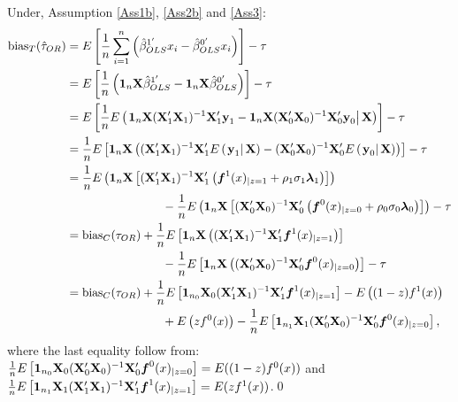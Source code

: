 \documentclass[11pt]{article}
\newcommand{\X}{{\bf X}}
\newcommand{\y}{{\bf y}}
\newcommand{\bias}{\mbox{bias}}
\begin{document}
\vspace{5mm}
\noindent Under, Assumption \ref{Ass1b}, \ref{Ass2b} and \ref{Ass3}: 
\begin{align*}
\bias_T(\hat \tau_{OR})&=E\left[\frac{1}{n}\sum \limits_{i =1}^n\left( \hat\beta^{1'}_{OLS}x_i-\hat\beta^{0'}_{OLS}x_i\right)\right] - \tau \\
&=E\left[\frac{1}{n}\left({\bf1}_n \X \hat\beta^{1'}_{OLS}- {\bf1}_n \X \hat\beta^{0'}_{OLS}\right)\right] - \tau\\
&= E\left[\frac{1}{n}E\left( \left.{\bf1}_n \X (\X_1'\X_1)^{-1}\X_1' \boldsymbol \y_1 - {\bf1}_n \X (\X_0'\X_0)^{-1}\X_0' \boldsymbol \y_0\right| \X\right)\right] -\tau\\
&=\frac{1}{n}E\left[ {\bf1}_n \X \left((\X_1'\X_1)^{-1}\X_1'E\left( \left.  \boldsymbol \y_1 \right| \X\right) -(\X_0'\X_0)^{-1}\X_0'E\left( \left.  \boldsymbol \y_0\right| \X\right) \right)\right]- \tau\\
&=\frac{1}{n}E\left( {\bf1}_n \X \left[(\X_1'\X_1)^{-1}\X_1' \left(  \boldsymbol f^1(x)_{|z=1} +\rho_1 \sigma_1 {\boldsymbol \lambda_1}\right)\right]\right)\\
&\qquad\qquad\qquad\qquad-\frac{1}{n}E\left( {\bf1}_n \X \left[(\X_0'\X_0)^{-1}\X_0'\left(  \boldsymbol f^0(x)_{|z=0} +\rho_0 \sigma_0 {\boldsymbol \lambda_0}\right)\right]\right)- \tau\\
&=\mbox{bias}_C(\tau_{OR})+\frac{1}{n}E\left[ {\bf1}_n \X \left((\X_1'\X_1)^{-1}\X_1'  \boldsymbol f^1(x)_{|z=1}  \right) \right]\\
&\qquad \qquad \qquad \qquad -\frac{1}{n}E\left[ {\bf1}_n \X \left((\X_0'\X_0)^{-1}\X_0'  \boldsymbol f^0(x)_{|z=0} \right) \right]- \tau\\
&=\mbox{bias}_C(\tau_{OR})+\frac{1}{n}E\left[ {\bf1}_{n_0} \X_0 (\X_1'\X_1)^{-1}\X_1'  \boldsymbol f^1(x)_{|z=1} \right]- E\left((1-z) f^1(x)\right)\\
&\qquad \qquad \qquad \qquad + E\left(z f^0(x) \right) - \frac{1}{n}E\left[ {\bf1}_{n_1} \X_1 (\X_0'\X_0)^{-1}\X_0'  \boldsymbol f^0(x)_{|z=0} \right],
\end{align*}
where the last equality follow from: $\frac{1}{n}E\left[ {\bf1}_{n_0} \X_0 (\X_0'\X_0)^{-1}\X_0'  \boldsymbol f^0(x)_{|z=0} \right]=E((1-z)f^0(x))$ and $\frac{1}{n}E\left[ {\bf1}_{n_1} \X_1 (\X_1'\X_1)^{-1}\X_1'  \boldsymbol f^1(x)_{|z=1} \right]=E(zf^1(x))$.\qed
\end{document}
